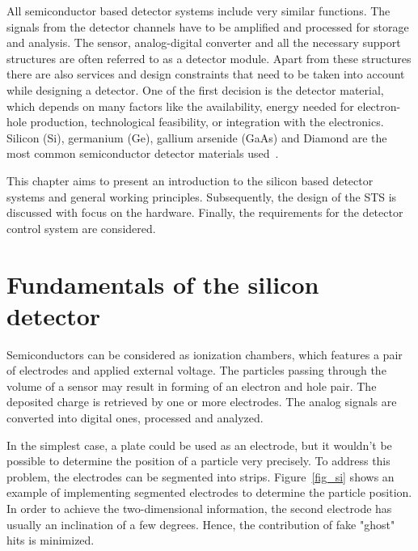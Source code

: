 
All semiconductor based detector systems include very similar functions. The signals from the detector channels have to be amplified and processed for storage and analysis. The sensor, analog-digital converter and all the necessary support structures are often referred to as a detector module. Apart from these structures there are also services and design constraints that need to be taken into account while designing a detector. One of the first decision is the detector material, which depends on many factors like the availability, energy needed for electron-hole production, technological feasibility, or integration with the electronics. Silicon (Si), germanium (Ge), gallium arsenide (GaAs) and Diamond are the most common semiconductor detector materials used~\cite{Lutz:1999wg,Hartmann:2017gzy}.


This chapter aims to present an introduction to the silicon based detector systems and general working principles. Subsequently, the design of the \gls{STS} is discussed with focus on the hardware. Finally, the requirements for the detector control system are considered. 

\section{Fundamentals of the silicon detector}
Semiconductors can be considered as ionization chambers, which features a pair of electrodes and applied external voltage. The particles passing through the volume of a sensor may result in forming of an electron and hole pair. The deposited charge is retrieved by one or more electrodes. The analog signals are converted into digital ones, processed and analyzed.

In the simplest case, a plate could be used as an electrode, but it wouldn't be possible to determine the position of a particle very precisely. To address this problem, the electrodes can be segmented into strips. Figure~\ref{fig_si} shows an example of implementing segmented electrodes to determine the particle position. In order to achieve the two-dimensional information, the second electrode has usually an inclination of a few degrees. Hence, the contribution of fake "ghost" hits is minimized.  

